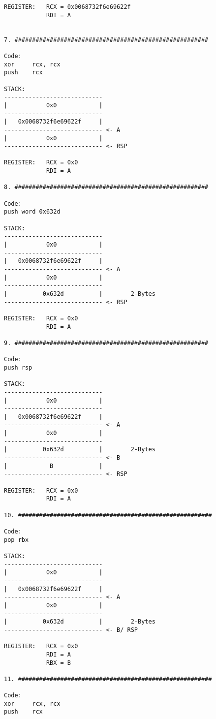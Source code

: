 \documentclass[12pt]{article}
\begin{document}
\begin{lstlisting}
REGISTER:   RCX = 0x0068732f6e69622f
            RDI = A


7. #######################################################

Code:
xor     rcx, rcx
push    rcx

STACK:
----------------------------
|           0x0            |
----------------------------
|   0x0068732f6e69622f     |
---------------------------- <- A
|           0x0            |
---------------------------- <- RSP

REGISTER:   RCX = 0x0
            RDI = A

8. #######################################################

Code:
push word 0x632d

STACK:
----------------------------
|           0x0            |
----------------------------
|   0x0068732f6e69622f     |
---------------------------- <- A
|           0x0            |
----------------------------
|          0x632d          |        2-Bytes
---------------------------- <- RSP

REGISTER:   RCX = 0x0
            RDI = A

9. #######################################################

Code:
push rsp

STACK:
----------------------------
|           0x0            |        
----------------------------
|   0x0068732f6e69622f     |    
---------------------------- <- A
|           0x0            |    
----------------------------
|          0x632d          |        2-Bytes
---------------------------- <- B
|            B             |    
---------------------------- <- RSP

REGISTER:   RCX = 0x0
            RDI = A

10. #######################################################

Code:
pop rbx

STACK:
----------------------------
|           0x0            |        
----------------------------
|   0x0068732f6e69622f     |    
---------------------------- <- A
|           0x0            |    
----------------------------
|          0x632d          |        2-Bytes
---------------------------- <- B/ RSP

REGISTER:   RCX = 0x0
            RDI = A
            RBX = B

11. #######################################################

Code:
xor     rcx, rcx
push    rcx


\end{lstlisting}
\end{document}

